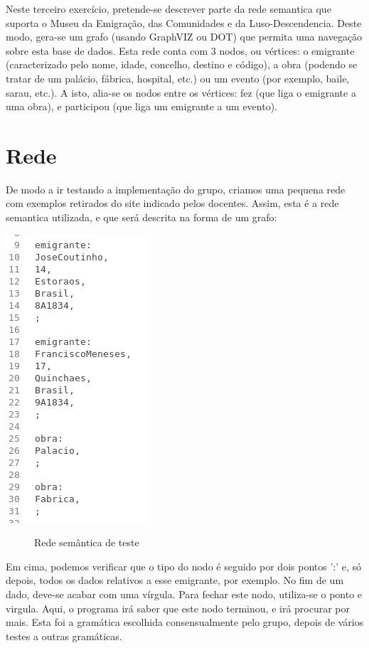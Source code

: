 \documentclass[a4paper]{article}
\begin{document}
Neste terceiro exercício, pretende-se descrever parte da rede semantica que suporta o Museu da Emigração, das Comunidades e da Luso-Descendencia. Deste modo, gera-se um grafo (usando GraphVIZ ou DOT) que permita uma navegação sobre esta base de dados. Esta rede conta com 3 nodos, ou vértices: o emigrante (caracterizado pelo nome, idade, concelho, destino e código), a obra (podendo se tratar de um palácio, fábrica, hospital, etc.) ou um evento (por exemplo, baile, sarau, etc.). A isto, alia-se os nodos entre os vértices: fez (que liga o emigrante a uma obra), e participou (que liga um emigrante a um evento). 

\vspace{500px}
\section{Rede}
\label{sec:gawk}

De modo a ir testando a implementação do grupo, criamos uma pequena rede com exemplos retirados do site indicado pelos docentes.
Assim, esta é a rede semantica utilizada, e que será descrita na forma de um grafo:

\begin{center}
	\includegraphics[scale=0.85]{rede}
	\begin{figure}[!ht]
	\caption{Rede semântica de teste}
	\end{figure}
\end{center}

Em cima, podemos verificar que o tipo do nodo é seguido por dois pontos ':' e, só depois, todos os dados relativos a esse emigrante, por exemplo.
No fim de um dado, deve-se acabar com uma vírgula.
Para fechar este nodo, utiliza-se o ponto e virgula. Aqui, o programa irá saber que este nodo terminou, e irá procurar por mais.
Esta foi a gramática escolhida consensualmente pelo grupo, depois de vários testes a outras gramáticas.
\end{document}
